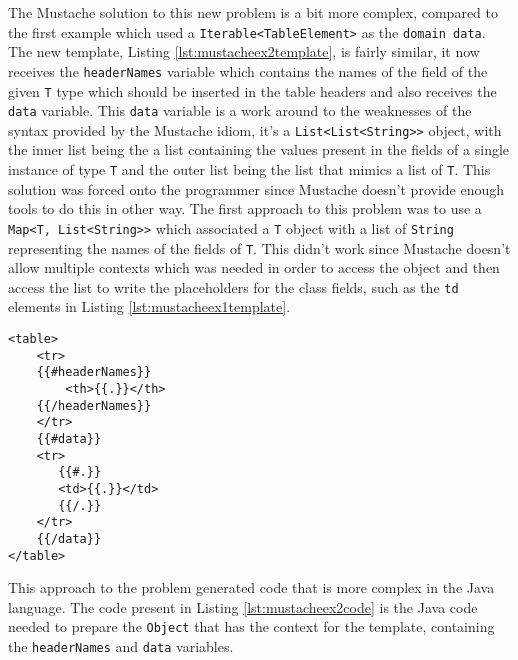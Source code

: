 \noindent
The Mustache solution to this new problem is a bit more complex, compared to the first example which used a \texttt{Iterable<TableElement>} as the \texttt{domain data}. The new template, Listing \ref{lst:mustacheex2template}, is fairly similar, it now receives the \texttt{headerNames} variable which contains the names of the field of the given \texttt{T} type which should be inserted in the table headers and also receives the \texttt{data} variable. This \texttt{data} variable is a work around to the weaknesses of the syntax provided by the Mustache idiom, it's a \texttt{List<List<String>>} object, with the inner list being the a list containing the values present in the fields of a single instance of type \texttt{T} and the outer list being the list that mimics a list of \texttt{T}. This solution was forced onto the programmer since Mustache doesn't provide enough tools to do this in other way. The first approach to this problem was to use a \texttt{Map<T, List<String>>} which associated a \texttt{T} object with a list of \texttt{String} representing the names of the fields of \texttt{T}. This didn't work since Mustache doesn't allow multiple contexts which was needed in order to access the object and then access the list to write the placeholders for the class fields, such as the \texttt{td} elements in Listing \ref{lst:mustacheex1template}.


\begin{minipage}{\linewidth}
\begin{lstlisting}[caption={Company Information Table Element}, label={lst:mustacheex2template}]
<table>
    <tr>
    {{#headerNames}}
        <th>{{.}}</th>
    {{/headerNames}}
    </tr>
    {{#data}}
    <tr>
       {{#.}}
       <td>{{.}}</td>
       {{/.}}
    </tr>
    {{/data}}
</table>
\end{lstlisting}
\end{minipage} 

\noindent
This approach to the problem generated code that is more complex in the Java language. The code present in Listing \ref{lst:mustacheex2code} is the Java code needed to prepare the \texttt{Object} that has the context for the template, containing the \texttt{headerNames} and \texttt{data} variables.



